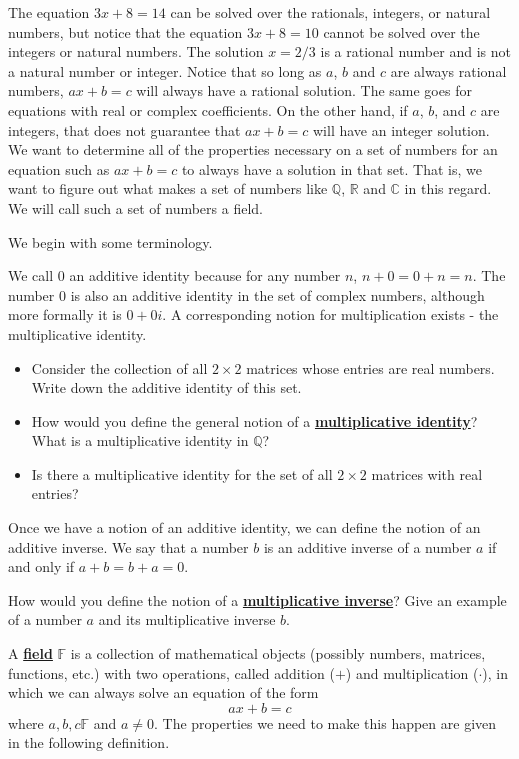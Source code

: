 \documentclass[11pt]{article}
\newenvironment{task}
	{\begin{mdframed}[linecolor=lightgray, linewidth=3pt]\raggedright}
	{\end{mdframed}}
\renewcommand\emph[1]{\underline{\bf{#1}}} %
\theoremstyle{definition}
\begin{document}
The equation $3x+8=14$ can be solved over the rationals, integers, or natural numbers, but notice that the equation $3x+8=10$ cannot be solved over
the integers or natural numbers. The solution $x=2/3$ is a rational number and is not a natural number or integer. Notice that so long as $a$, $b$ and
$c$ are always rational numbers, $ax+b=c$ will always have a rational solution.  The same goes for equations with real or complex coefficients. On the
other hand, if $a$, $b$, and $c$ are integers, that does not guarantee that $ax+b=c$ will have an integer solution. We want to determine all of the 
properties necessary on a set of numbers for an equation such as $ax+b=c$ to always have a solution in that set. That is, we want to figure out
what makes a set of numbers like $\mathbb{Q}$, $\mathbb{R}$ and $\mathbb{C}$ in this regard. We will call such a set of numbers a field.

We begin with some terminology.

We call $0$ an additive identity because for any number $n$, $n+0 = 0 + n = n$. The number $0$ is also an additive identity in the set of complex numbers,
although more formally it is $0+0i$. A corresponding notion for multiplication exists - the multiplicative identity.

\begin{task}
  \begin{itemize}
    \item Consider the collection of all $2\times 2$ matrices whose entries are real numbers. Write down the additive identity of this set.
    \item How would you define the general notion of a \emph{multiplicative identity}? What is a multiplicative identity in $\mathbb{Q}$?
    \item Is there a multiplicative identity for the set of all $2\times 2$ matrices with real entries?
  \end{itemize}
\end{task}

Once we have a notion of an additive identity, we can define the notion of an additive inverse. We say that 
a number $b$ is an additive inverse of a number $a$ if and only if $a+b=b+a = 0$. 

\begin{task}
  How would you define the notion of a \emph{multiplicative inverse}? Give an example of a number $a$ and its 
  multiplicative inverse $b$.
\end{task}

A \emph{field} $\mathbb{F}$ is a collection of mathematical objects (possibly numbers, matrices, functions, etc.) with two operations, called
addition ($+$) and multiplication ($\cdot$), in which we can always solve an equation of the form
\[ ax + b = c\]
where $a,b,c\mathbb{F}$ and $a \neq 0$. The properties we need to make this happen are given in the following definition.
\end{document}

